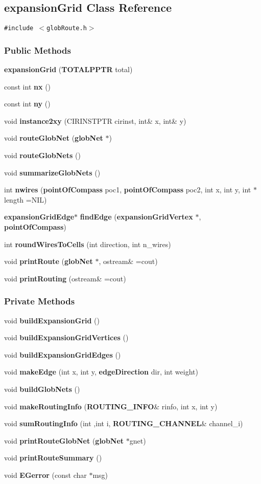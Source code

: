 \subsection{expansion\-Grid  Class Reference}
\label{expansionGrid}
{\tt \#include $<$glob\-Route.h$>$}

\subsubsection*{Public Methods}
\begin{CompactItemize}
\item 
{\bf expansion\-Grid} ({\bf TOTALPPTR} total)
\item 
const int {\bf nx} ()
\item 
const int {\bf ny} ()
\item 
void {\bf instance2xy} (CIRINSTPTR cirinst, int\& x, int\& y)
\item 
void {\bf route\-Glob\-Net} ({\bf glob\-Net} $\ast$)
\item 
void {\bf route\-Glob\-Nets} ()
\item 
void {\bf summarize\-Glob\-Nets} ()
\item 
int {\bf nwires} ({\bf point\-Of\-Compass} poc1, {\bf point\-Of\-Compass} poc2, int x, int y, int $\ast$length =NIL)
\item 
{\bf expansion\-Grid\-Edge}$\ast$ {\bf find\-Edge} ({\bf expansion\-Grid\-Vertex} $\ast$, {\bf point\-Of\-Compass})
\item 
int {\bf round\-Wires\-To\-Cells} (int direction, int n\_\-wires)
\item 
void {\bf print\-Route} ({\bf glob\-Net} $\ast$, ostream\& =cout)
\item 
void {\bf print\-Routing} (ostream\& =cout)
\end{CompactItemize}
\subsubsection*{Private Methods}
\begin{CompactItemize}
\item 
void {\bf build\-Expansion\-Grid} ()
\item 
void {\bf build\-Expansion\-Grid\-Vertices} ()
\item 
void {\bf build\-Expansion\-Grid\-Edges} ()
\item 
void {\bf make\-Edge} (int x, int y, {\bf edge\-Direction} dir, int weight)
\item 
void {\bf build\-Glob\-Nets} ()
\item 
void {\bf make\-Routing\-Info} ({\bf ROUTING\_\-INFO}\& rinfo, int x, int y)
\item 
void {\bf sum\-Routing\-Info} (int ,int i, {\bf ROUTING\_\-CHANNEL}\& channel\_\-i)
\item 
void {\bf print\-Route\-Glob\-Net} ({\bf glob\-Net} $\ast$gnet)
\item 
void {\bf print\-Route\-Summary} ()
\item 
void {\bf EGerror} (const char $\ast$msg)
\end{CompactItemize}
